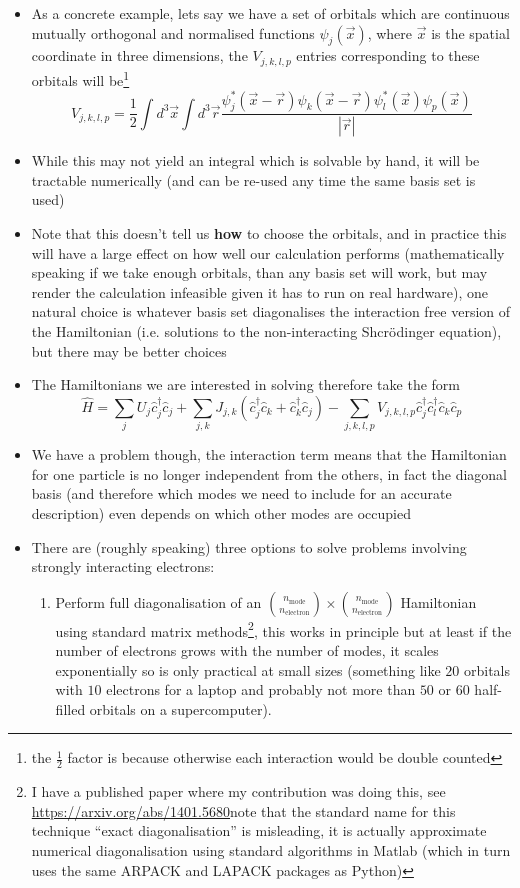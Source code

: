 \documentclass[english]{article}
\begin{document}
\begin{itemize}
\item As a concrete example, lets say we have a set of orbitals which are continuous mutually orthogonal and normalised functions $\psi_j(\vec{x})$, where $\vec{x}$ is the spatial coordinate in three dimensions, the $V_{j,k,l,p}$ entries corresponding to these orbitals will be\footnote{the $\frac{1}{2}$ factor is because otherwise each interaction would be double counted} 
\begin{equation}
V_{j,k,l,p}=\frac{1}{2}\int d^3\vec{x}\int d^3\vec{r}\frac{\psi^*_j(\vec{x}-\vec{r})\psi_k(\vec{x}-\vec{r})\psi^*_l(\vec{x})\psi_p(\vec{x})}{|\vec{r}|}
\end{equation}
\item While this may not yield an integral which is solvable by hand, it will be tractable numerically (and can be re-used any time the same basis set is used)
\item Note that this doesn't tell us \textbf{how} to choose the orbitals, and in practice this will have a large effect on how well our calculation performs (mathematically speaking if we take enough orbitals, than any basis set will work, but may render the calculation infeasible given it has to run on real hardware), one natural choice is whatever basis set diagonalises the interaction free version of the Hamiltonian (i.e. solutions to the non-interacting Shcr{\"o}dinger equation), but there may be better choices
\item The Hamiltonians we are interested in solving therefore take the form
\begin{equation}
\hat{H}=\sum_{j}U_j\hat{c}^\dagger_j\hat{c}_j+\sum_{j,k}J_{j,k}\left(\hat{c}^\dagger_j\hat{c}_k+\hat{c}^\dagger_k\hat{c}_j\right)-\sum_{j,k,l,p}V_{j,k,l,p}\hat{c}^\dagger_j\hat{c}^\dagger_l\hat{c}_k\hat{c}_p
\end{equation}
\item We have a problem though, the interaction term means that the Hamiltonian for one particle is no longer independent from the others, in fact the diagonal basis (and therefore which modes we need to include for an accurate description) even depends on which other modes are occupied 
\item There are (roughly speaking) three options to solve problems involving strongly interacting electrons:
\begin{enumerate}
\item Perform full diagonalisation of an $\binom{n_{\mathrm{mode}}}{n_{\mathrm{electron}}}\times \binom{n_{\mathrm{mode}}}{n_{\mathrm{electron}}}$ Hamiltonian using standard matrix methods\footnote{I have a published paper where my contribution was doing this, see \href{https://arxiv.org/abs/1401.5680}{https://arxiv.org/abs/1401.5680}note that the standard name for this technique ``exact diagonalisation'' is misleading, it is actually approximate numerical diagonalisation using standard algorithms in Matlab (which in turn uses the same ARPACK and LAPACK packages as Python)}, this works in principle but at least if the number of electrons grows with the number of modes, it scales exponentially so is only practical at small sizes (something like $20$ orbitals with $10$ electrons for a laptop and probably not more than $50$ or $60$ half-filled orbitals on a supercomputer).

\end{enumerate}
\end{itemize}
\end{document}
